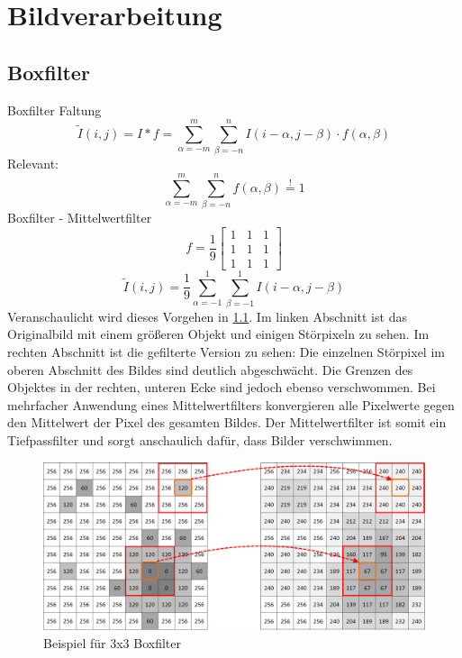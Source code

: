 \chapter{Bildverarbeitung}
\section{Boxfilter}
Boxfilter
Faltung
$$ \widetilde{I}(i, j)=I \ast f =  \sum_{\alpha=-m}^m \sum_{\beta=-n}^n I(i-\alpha, j-\beta) \cdot f(\alpha, \beta)$$
Relevant: 
$$ \sum_{\alpha=-m}^m \sum_{\beta=-n}^n f(\alpha, \beta) \stackrel{!}{=} 1 $$
Boxfilter - Mittelwertfilter
$$ f=\frac{1}{9} \begin{bmatrix} 1&1&1 \\ 1&1&1 \\ 1&1&1 \end{bmatrix}$$
$$ \widetilde{I}(i, j)=\frac{1}{9} \sum_{\alpha=-1}^1 \sum_{\beta=-1}^1 I(i-\alpha, j-\beta) $$
Veranschaulicht wird dieses Vorgehen in \ref{fig:boxfilter}. Im linken Abschnitt ist das Originalbild mit einem gr\"o\ss{}eren Objekt und einigen St\"orpixeln zu sehen. Im rechten Abschnitt ist die gefilterte Version zu sehen: Die einzelnen St\"orpixel im oberen Abschnitt des Bildes sind deutlich abgeschw\"acht. Die Grenzen des Objektes in der rechten, unteren Ecke sind jedoch ebenso verschwommen. Bei mehrfacher Anwendung eines Mittelwertfilters konvergieren alle Pixelwerte gegen den Mittelwert der Pixel des gesamten Bildes. Der Mittelwertfilter ist somit ein Tiefpassfilter und sorgt anschaulich daf\"ur, dass Bilder verschwimmen.
\begin{figure}
 \centering
 \includegraphics[width=1\textwidth]{media/filter/boxfilter_combined.png}
 \caption{Beispiel für 3x3 Boxfilter}
 \label{fig:boxfilter}
\end{figure}


